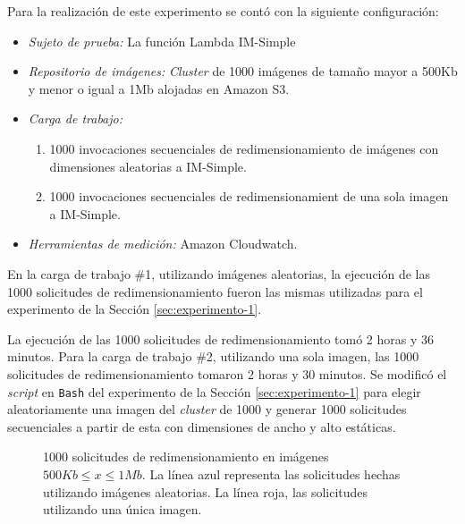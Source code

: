 Para la realización de este experimento se contó con la siguiente configuración:
\begin{itemize}
    \item \emph{Sujeto de prueba:} La función Lambda IM-Simple
    \item \emph{Repositorio de imágenes:} \emph{Cluster} de 1000 imágenes de tamaño mayor a 500Kb y menor o igual a 1Mb alojadas en Amazon S3.
    \item \emph{Carga de trabajo:} 
    \begin{enumerate}
        \item 1000 invocaciones secuenciales de redimensionamiento de imágenes con dimensiones aleatorias a IM-Simple.
        \item 1000 invocaciones secuenciales de redimensionamient de una sola imagen a IM-Simple.
    \end{enumerate}
    \item \emph{Herramientas de medición:} Amazon Cloudwatch.
\end{itemize}

En la carga de trabajo \#1, utilizando imágenes aleatorias, la ejecución de las 1000 solicitudes de redimensionamiento fueron las mismas utilizadas para el experimento de la Sección \ref{sec:experimento-1}. 

La ejecución de las 1000 solicitudes de redimensionamiento tomó 2 horas y 36 minutos. Para la carga de trabajo \#2, utilizando una sola imagen, las 1000 solicitudes de redimensionamiento tomaron 2 horas y 30 minutos. Se modificó el \emph{script} en \texttt{Bash} del experimento de la Sección \ref{sec:experimento-1} para elegir aleatoriamente una imagen del \emph{cluster} de 1000 y generar 1000 solicitudes secuenciales a partir de esta con dimensiones de ancho y alto estáticas.

\begin{figure}[h]
\hspace{-1.5cm}
\caption{1000 solicitudes de redimensionamiento en imágenes $500Kb \leq x \leq 1Mb$. La línea azul representa las solicitudes hechas utilizando imágenes aleatorias. La línea roja, las solicitudes utilizando una única imagen.}
\label{fig:1000-ejecuciones-secuenciales-1mb}
\end{figure}

